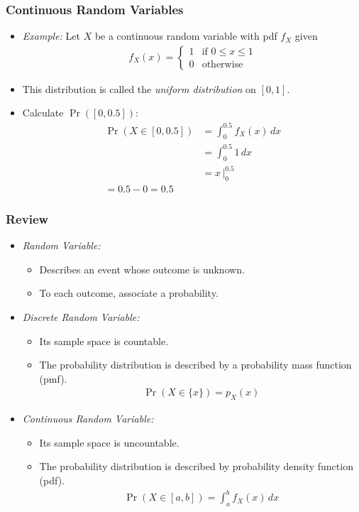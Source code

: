 \begin{frame}
\frametitle{Continuous Random Variables} 
\begin{itemize}
\item \emph{Example:}
Let $X$ be a continuous random variable with pdf $f_X$ given
\begin{align*}
f_X(x) = 
  \begin{cases}
  1 & \text{if } 0\leq x \leq 1\\[1ex]
  0 & \text{otherwise }
  \end{cases}	
\end{align*}
\item This distribution is called the \emph{uniform distribution} on $[0,1]$.
\item Calculate $\Pr([0,0.5])$:
\begin{align*}
\Pr(X\in[0,0.5]) 
   & = \int_0^{0.5} f_X(x)\, dx\\ 
   & = \int_0^{0.5} 1\, dx \\
   & = x \,\bigg|_0^{0.5}\\
     = 0.5 - 0
     = 0.5
\end{align*}
\end{itemize}
\end{frame}


\begin{frame}
\frametitle{Review} 
\begin{itemize}
\item \emph{Random Variable:}
\begin{itemize}
\item Describes an event whose outcome is unknown.
\item To each outcome, associate a probability.
\end{itemize}
\item \emph{Discrete Random Variable:}
\begin{itemize}
\item Its sample space is countable.
\item The probability distribution is described by a probability mass function (pmf).
\begin{align*}
\Pr(X\in\{x\}) = p_X(x)
\end{align*}
\end{itemize}\vspace{-2ex}
\item \emph{Continuous Random Variable:}
\begin{itemize}
\item Its sample space is uncountable.
\item The probability distribution is described by probability density function (pdf).
\begin{align*}
\Pr(X\in[a,b]) = \int_{a}^{b} f_X(x)\,dx
\end{align*}
\end{itemize}
\end{itemize}
\end{frame}



